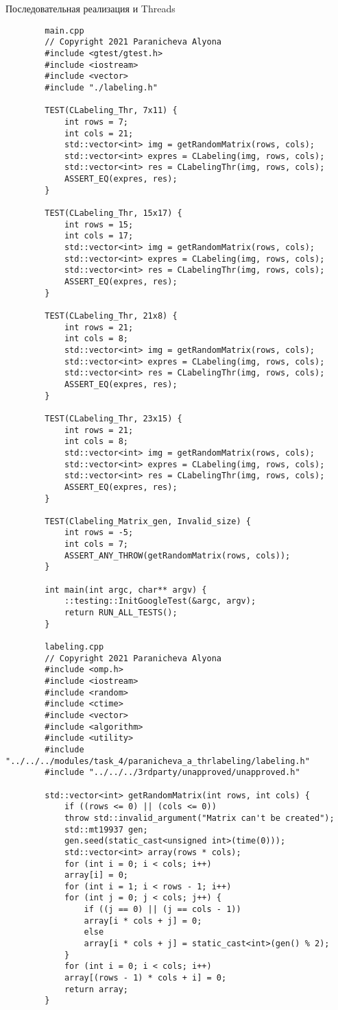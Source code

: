 \documentclass{report}
\begin{document}
	    \par Последовательная реализация и Threads
	\begin{lstlisting}
	    main.cpp
	    // Copyright 2021 Paranicheva Alyona
	    #include <gtest/gtest.h>
	    #include <iostream>
	    #include <vector>
	    #include "./labeling.h"
	    
	    TEST(CLabeling_Thr, 7x11) {
	    	int rows = 7;
	    	int cols = 21;
	    	std::vector<int> img = getRandomMatrix(rows, cols);
	    	std::vector<int> expres = CLabeling(img, rows, cols);
	    	std::vector<int> res = CLabelingThr(img, rows, cols);
	    	ASSERT_EQ(expres, res);
	    }
	    
	    TEST(CLabeling_Thr, 15x17) {
	    	int rows = 15;
	    	int cols = 17;
	    	std::vector<int> img = getRandomMatrix(rows, cols);
	    	std::vector<int> expres = CLabeling(img, rows, cols);
	    	std::vector<int> res = CLabelingThr(img, rows, cols);
	    	ASSERT_EQ(expres, res);
	    }
	    
	    TEST(CLabeling_Thr, 21x8) {
	    	int rows = 21;
	    	int cols = 8;
	    	std::vector<int> img = getRandomMatrix(rows, cols);
	    	std::vector<int> expres = CLabeling(img, rows, cols);
	    	std::vector<int> res = CLabelingThr(img, rows, cols);
	    	ASSERT_EQ(expres, res);
	    }
	    
	    TEST(CLabeling_Thr, 23x15) {
	    	int rows = 21;
	    	int cols = 8;
	    	std::vector<int> img = getRandomMatrix(rows, cols);
	    	std::vector<int> expres = CLabeling(img, rows, cols);
	    	std::vector<int> res = CLabelingThr(img, rows, cols);
	    	ASSERT_EQ(expres, res);
	    }
	    
	    TEST(Clabeling_Matrix_gen, Invalid_size) {
	    	int rows = -5;
	    	int cols = 7;
	    	ASSERT_ANY_THROW(getRandomMatrix(rows, cols));
	    }
	    
	    int main(int argc, char** argv) {
	    	::testing::InitGoogleTest(&argc, argv);
	    	return RUN_ALL_TESTS();
	    }
	    
	    labeling.cpp
	    // Copyright 2021 Paranicheva Alyona
	    #include <omp.h>
	    #include <iostream>
	    #include <random>
	    #include <ctime>
	    #include <vector>
	    #include <algorithm>
	    #include <utility>
	    #include "../../../modules/task_4/paranicheva_a_thrlabeling/labeling.h"
	    #include "../../../3rdparty/unapproved/unapproved.h"
	    
	    std::vector<int> getRandomMatrix(int rows, int cols) {
	    	if ((rows <= 0) || (cols <= 0))
	    	throw std::invalid_argument("Matrix can't be created");
	    	std::mt19937 gen;
	    	gen.seed(static_cast<unsigned int>(time(0)));
	    	std::vector<int> array(rows * cols);
	    	for (int i = 0; i < cols; i++)
	    	array[i] = 0;
	    	for (int i = 1; i < rows - 1; i++)
	    	for (int j = 0; j < cols; j++) {
	    		if ((j == 0) || (j == cols - 1))
	    		array[i * cols + j] = 0;
	    		else
	    		array[i * cols + j] = static_cast<int>(gen() % 2);
	    	}
	    	for (int i = 0; i < cols; i++)
	    	array[(rows - 1) * cols + i] = 0;
	    	return array;
	    }
	    

\end{lstlisting}
\end{document}
